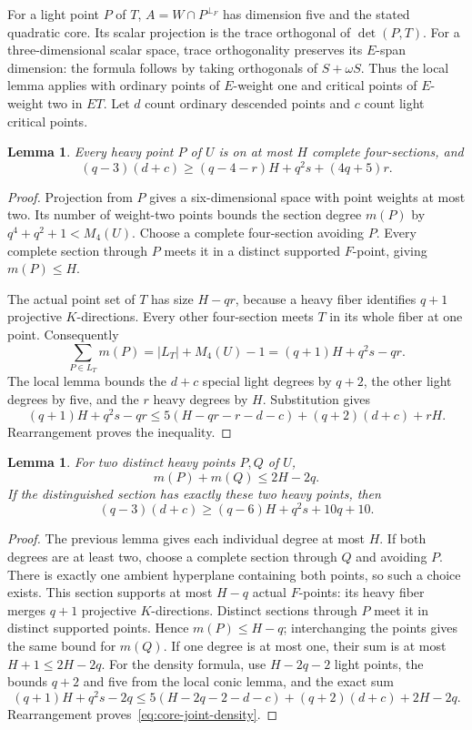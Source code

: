 \documentclass[12pt,letterpaper,onecolumn]{article}
\newtheorem{lemma}[theorem]{Lemma}
\theoremstyle{definition}
\theoremstyle{remark}
\begin{document}
For a light point \(P\) of \(T\), \(A=W\cap P^{\perp_F}\) has dimension five and the stated quadratic core.
Its scalar projection is the trace orthogonal of \(\det(P,T)\).
For a three-dimensional scalar space, trace orthogonality preserves its \(E\)-span dimension: the formula follows by taking orthogonals of \(S+\omega S\).
Thus the local lemma applies with ordinary points of \(E\)-weight one and critical points of \(E\)-weight two in \(ET\).
Let \(d\) count ordinary descended points and \(c\) count light critical points.

\begin{lemma}\label{lem:core-weighted-incidence}
Every heavy point \(P\) of \(U\) is on at most \(H\) complete four-sections, and
\[
(q-3)(d+c)\ge(q-4-r)H+q^2s+(4q+5)r.
\]
\end{lemma}
\begin{proof}
Projection from \(P\) gives a six-dimensional space with point weights at most two.
Its number of weight-two points bounds the section degree \(m(P)\) by \(q^4+q^2+1<M_4(U)\).
Choose a complete four-section avoiding \(P\).
Every complete section through \(P\) meets it in a distinct supported \(F\)-point, giving \(m(P)\le H\).

The actual point set of \(T\) has size \(H-qr\), because a heavy fiber identifies \(q+1\) projective \(K\)-directions.
Every other four-section meets \(T\) in its whole fiber at one point. Consequently
\[
\sum_{P\in L_T}m(P)=|L_T|+M_4(U)-1=(q+1)H+q^2s-qr.
\]
The local lemma bounds the \(d+c\) special light degrees by \(q+2\), the other light degrees by five, and the \(r\) heavy degrees by \(H\).
Substitution gives
\[
(q+1)H+q^2s-qr
\le5(H-qr-r-d-c)+(q+2)(d+c)+rH.
\]
Rearrangement proves the inequality.
\end{proof}

\begin{lemma}\label{lem:core-joint-heavy}
For two distinct heavy points \(P,Q\) of \(U\),
\[
m(P)+m(Q)\le2H-2q.
\]
If the distinguished section has exactly these two heavy points, then
\begin{equation}\label{eq:core-joint-density}
(q-3)(d+c)\ge(q-6)H+q^2s+10q+10.
\end{equation}
\end{lemma}
\begin{proof}
The previous lemma gives each individual degree at most \(H\).
If both degrees are at least two, choose a complete section through \(Q\) and avoiding \(P\). There is exactly one ambient hyperplane containing both points, so such a choice exists.
This section supports at most \(H-q\) actual \(F\)-points: its heavy fiber merges \(q+1\) projective \(K\)-directions.
Distinct sections through \(P\) meet it in distinct supported points. Hence \(m(P)\le H-q\); interchanging the points gives the same bound for \(m(Q)\).
If one degree is at most one, their sum is at most \(H+1\le2H-2q\).
For the density formula, use \(H-2q-2\) light points, the bounds \(q+2\) and five from the local conic lemma, and the exact sum
\[
(q+1)H+q^2s-2q
\le5(H-2q-2-d-c)+(q+2)(d+c)+2H-2q.
\]
Rearrangement proves~\eqref{eq:core-joint-density}.
\end{proof}
\end{document}
